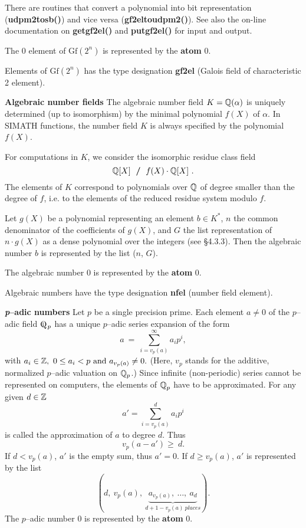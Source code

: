 There are routines that convert a polynomial into bit representation ({\bf udpm2tosb()})
and vice versa ({\bf gf2eltoudpm2()}). See also the on-line documentation on {\bf getgf2el()}
and {\bf putgf2el()} for input and output. 

The $0$ element of $\mbox{Gf}(2^n)$ is represented by the {\bf atom} $0$.

Elements of $\mbox{Gf}(2^n)$ has the type designation {\bf gf2el} (Galois field of characteristic 2 element).

\newpage
\leer
{\bf Algebraic number fields}
\leer 
The algebraic number field $K = \mbox{$\mathbb Q$}(\alpha)$ is uniquely determined (up to isomorphism)
by the minimal polynomial {\bf $f(X)$} of {\bf $\alpha$}. In SIMATH functions, the number
field {\bf $K$} is always specified by the polynomial {\bf $f(X)$}.

For computations in {\bf $K$}, we consider the isomorphic residue class field 
$$
\mbox{$\mathbb Q$}[X]\ \mbox{\hspace*{3pt}{\bf /}\hspace*{3pt}}\  f(X) \cdot \mbox{$\mathbb Q$}[X]\ .
$$ 
The elements of $K$ correspond to polynomials over $\mbox{$\mathbb Q$}$ of degree smaller than
the degree of $f$, i.e.\/ to the elements of the reduced residue system modulo {\bf $f$}.

Let $g(X)$ be a polynomial representing an element $b \in K^*$, $n$ the common denominator of
the coefficients of $g(X)$, and $G$ the list representation of $n\cdot g(X)$ as a dense polynomial
over the integers (see \S 4.3.3). Then the algebraic number $b$ is represented by the list
($n$, $G$).

The algebraic number $0$ is represented by the {\bf atom} $0$.

Algebraic numbers have the type designation {\bf nfel} (number field element).

\leer
{\bf {\it p\/}\/--adic numbers}
\leer
Let $p$ be a single precision prime.
Each element $a\not=0$ of the $p$\/--adic field {\bf $\Qfett_p$} 
has a unique $p$\/--adic series expansion of the form
$$
a\ =\ \sum_{i=v_p(a)}^{\infty} a_i p^i,
$$
with $ a_i \in \mbox{$\mathbb Z$} ,\ 0 \leq a_i < p \mbox{ and } a_{v_p(a)} \neq 0.$
(Here, $v_p$ stands for the additive, normalized $p$\/--adic valuation 
on $\mbox{$\mathbb Q$}\!\,_p$.)
Since infinite (non-periodic) series cannot be represented on computers,
the elements of $\mbox{$\mathbb Q$}_p$ have to be approximated. For any given $d \in \mbox{$\mathbb Z$}$ 
$$
a' = \sum_{i=v_p(a)}^{d} a_i p^i
$$
is called the approximation of $a$ to degree $d$. Thus 
$$ 
v_p(a-a') \geq\ d.
$$
If $d < v_p(a)$, $a'$ is the empty sum, thus $a'=0$. 
If $d\geq v_p(a)$, $a'$ is represented by the list
$$ 
     (d,\ v_p(a) ,\ \underbrace{a_{v_p(a)},\ \ldots,\ 
            a_d}_{d+1-v_p(a)\ places}). 
$$
The $p$\/--adic number $0$ is represented by the {\bf atom} $0$.

